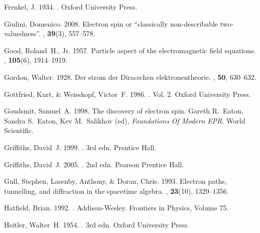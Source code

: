 \documentclass[onecolumn,secnumarabic,amsmath,amssymb,balancelastpage,nofootinbib]{article}
\begin{document}
\begin{thebibliography}{}
Frenkel, J. 1934.
.
\newblock Oxford University Press.

Giulini, Domenico. 2008.
\newblock Electron spin or ``classically non-describable two-valuedness''.
, {\bf
  39}(3), 557--578.

Good, Roland~H., Jr. 1957.
\newblock Particle aspect of the electromagnetic field equations.
, {\bf 105}(6), 1914--1919.

Gordon, Walter. 1928.
\newblock Der strom der Diracschen elektronentheorie.
, {\bf 50}, 630--632.

Gottfried, Kurt, \& Weisskopf, Victor~F. 1986.
.
\newblock  Vol. 2.
\newblock Oxford University Press.

Goudsmit, Samuel~A. 1998.
\newblock The discovery of electron spin.
 Gareth R.~Eaton, Sandra S.~Eaton, Kev
  M.~Salikhov (ed), {\em Foundations Of Modern EPR}.
\newblock World Scientific.

Griffiths, David~J. 1999.
. 3rd edn.
\newblock Prentice Hall.

Griffiths, David~J. 2005.
. 2nd edn.
\newblock Pearson Prentice Hall.

Gull, Stephen, Lasenby, Anthony, \& Doran, Chris. 1993.
\newblock Electron paths, tunnelling, and diffraction in the spacetime algebra.
, {\bf 23}(10), 1329--1356.

Hatfield, Brian. 1992.
.
\newblock Addison-Wesley.
\newblock Frontiers in Physics, Volume 75.

Heitler, Walter~H. 1954.
. 3rd edn.
\newblock Oxford University Press.


\end{thebibliography}
\end{document}
